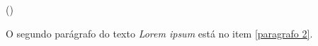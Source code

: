 \documentclass[a4paper,12pt]{article}
\begin{document}
	
	\begin{list}
		{()}
		{
		 \setlength{\itemindent}{\parindent}
		 \setlength{\itemsep}{0pt}
		 \setlength{\rightmargin}{\leftmargin}
		}
	
		\item \lipsum[1] %
		
		\item \label{paragrafo 2}
					\lipsum[2] %
					
		\item \lipsum[3] %
	\end{list}
	
	O segundo parágrafo do texto \textit{Lorem ipsum} está no item
	\ref{paragrafo 2}.
\end{document}
